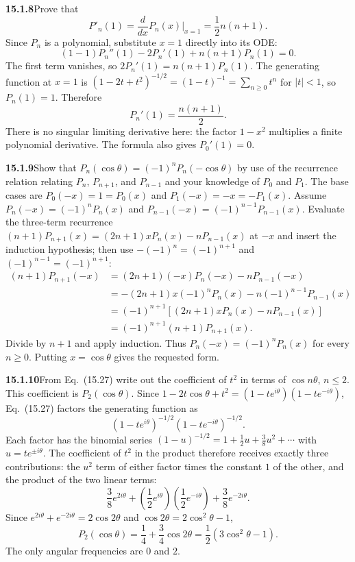 \par\bigskip
\noindent\textbf{15.1.8}\quad Prove that
\[
P'_{n}(1)=\frac{d}{dx}P_{n}(x)\Big|_{x=1}=\frac{1}{2}n(n+1).
\]
\solution
Since $P_n$ is a polynomial, substitute $x=1$ directly into its ODE:
\[
(1-1)P_n''(1)-2P_n'(1)+n(n+1)P_n(1)=0.
\]
The first term vanishes, so $2P_n'(1)=n(n+1)P_n(1)$.
The generating function at $x=1$ is
$(1-2t+t^2)^{-1/2}=(1-t)^{-1}=\sum_{n\ge0}t^n$ for $|t|<1$, so
$P_n(1)=1$. Therefore
\[
\boxed{P_n'(1)=\frac{n(n+1)}2}.
\]
There is no singular limiting derivative here: the factor $1-x^2$
multiplies a finite polynomial derivative. The formula also gives
$P_0'(1)=0$.

\par\bigskip
\noindent\textbf{15.1.9}\quad Show that
$P_{n}(\cos\theta)=(-1)^{n}P_{n}(-\cos\theta)$ by use of the
recurrence relation relating $P_{n}$, $P_{n+1}$, and $P_{n-1}$ and
your knowledge of $P_{0}$ and $P_{1}$.
\solution
The base cases are $P_0(-x)=1=P_0(x)$ and
$P_1(-x)=-x=-P_1(x)$. Assume
$P_n(-x)=(-1)^nP_n(x)$ and $P_{n-1}(-x)=(-1)^{n-1}P_{n-1}(x)$.
Evaluate the three-term recurrence
$(n+1)P_{n+1}(x)=(2n+1)xP_n(x)-nP_{n-1}(x)$ at $-x$ and insert the
induction hypothesis; then use $-(-1)^n=(-1)^{n+1}$ and
$(-1)^{n-1}=(-1)^{n+1}$:
\begin{align*}
(n+1)P_{n+1}(-x)
&=(2n+1)(-x)P_n(-x)-nP_{n-1}(-x)\\
&=-(2n+1)x(-1)^nP_n(x)-n(-1)^{n-1}P_{n-1}(x)\\
&=(-1)^{n+1}[(2n+1)xP_n(x)-nP_{n-1}(x)]\\
&=(-1)^{n+1}(n+1)P_{n+1}(x).
\end{align*}
Divide by $n+1$ and apply induction. Thus
$P_n(-x)=(-1)^nP_n(x)$ for every $n\ge0$.
Putting $x=\cos\theta$ gives the requested form.

\par\bigskip
\noindent\textbf{15.1.10}\quad From Eq.~(15.27) write out the
coefficient of $t^{2}$ in terms of $\cos n\theta$, $n\le2$. This
coefficient is $P_{2}(\cos\theta)$.
\solution
Since $1-2t\cos\theta+t^2=(1-te^{i\theta})(1-te^{-i\theta})$,
Eq.~(15.27) factors the generating function as
\[
(1-te^{i\theta})^{-1/2}(1-te^{-i\theta})^{-1/2}.
\]
Each factor has the binomial series
$(1-u)^{-1/2}=1+\frac12u+\frac38u^2+\cdots$ with $u=te^{\pm i\theta}$.
The coefficient of $t^2$ in the product therefore receives exactly
three contributions: the $u^2$ term of either factor times the
constant $1$ of the other, and the product of the two linear terms:
\[
\frac38e^{2i\theta}
+\left(\frac12e^{i\theta}\right)
 \left(\frac12e^{-i\theta}\right)
+\frac38e^{-2i\theta}.
\]
Since $e^{2i\theta}+e^{-2i\theta}=2\cos2\theta$ and
$\cos2\theta=2\cos^2\theta-1$,
\[
\boxed{P_2(\cos\theta)=\frac14+\frac34\cos2\theta
=\frac12(3\cos^2\theta-1)}.
\]
The only angular frequencies are $0$ and $2$.

